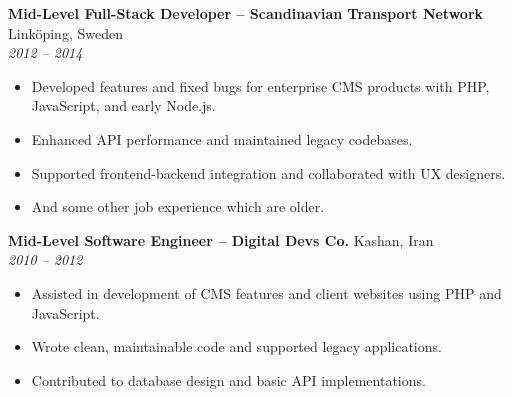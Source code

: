 \documentclass[a4paper,10pt]{article}
\begin{document}
	\textbf{Mid-Level Full-Stack Developer – Scandinavian Transport Network} \hfill Linköping, Sweden \\
	\textit{2012 -- 2014}
	\begin{itemize}
		\item Developed features and fixed bugs for enterprise CMS products with PHP, JavaScript, and early Node.js.
		\item Enhanced API performance and maintained legacy codebases.
		\item Supported frontend-backend integration and collaborated with UX designers.
		\item And some other job experience which are older.
	\end{itemize}
	
	\textbf{Mid-Level Software Engineer – Digital Devs Co.} \hfill Kashan, Iran \\
	\textit{2010 -- 2012}
	\begin{itemize}
		\item Assisted in development of CMS features and client websites using PHP and JavaScript.
		\item Wrote clean, maintainable code and supported legacy applications.
		\item Contributed to database design and basic API implementations.
	\end{itemize}
	
	\hspace{5pt}
	
\end{document}
